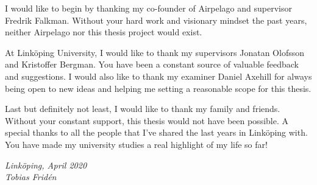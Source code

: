 \begin{acknowledgments}
I would like to begin by thanking my co-founder of Airpelago and supervisor Fredrik Falkman. 
Without your hard work and visionary mindset the past years, neither Airpelago nor this thesis project would exist.

At Linköping University, I would like to thank my supervisors Jonatan Olofsson and Kristoffer Bergman. You have been a 
constant source of valuable feedback and suggestions. I would also like to thank my examiner Daniel Axehill for always being open to 
new ideas and helping me setting a reasonable scope for this thesis.

Last but definitely not least, I would like to thank my family and friends. Without your constant support,
this thesis would not have been possible. A special thanks to all the people that I've shared the last years in Linköping with. 
You have made my university studies a real highlight of my life so far!

  \addvspace{1em}
  \begin{flushright}
    \textit{%
      Linköping, April 2020\\
      Tobias Fridén%
    }
  \end{flushright}
\end{acknowledgments}

